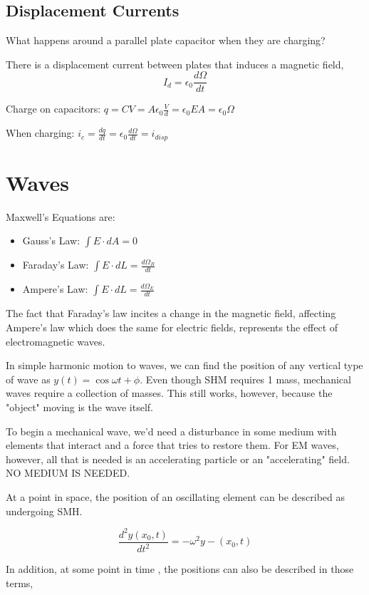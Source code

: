 \documentclass{article}
\begin{document}
\subsection{Displacement Currents}

What happens around a parallel plate capacitor when they are charging?

There is a displacement current between plates that induces a magnetic field, $$I_d=\epsilon_0\frac{d\Omega}{dt}$$

Charge on capacitors: $q=CV=A\epsilon_0 \frac{V}{d}=\epsilon_0 EA=\epsilon_0 \Omega$

When charging: $i_c=\frac{dq}{dt}=\epsilon_0\frac{d\Omega}{dt}=i_{disp}$

\section{Waves}

Maxwell's Equations are:
\begin{itemize}
	\item Gauss's Law: $\int{E\cdot dA}=0$
	\item Faraday's Law: $\int{E\cdot dL}=\frac{d\Omega_B}{dt}$
	\item Ampere's Law: $\int{E\cdot dL}=\frac{d\Omega_E}{dt}$

\end{itemize}

The fact that Faraday's law incites a change in the magnetic field, affecting Ampere's law which does the same for electric fields, 
represents the effect of electromagnetic waves.

In simple harmonic motion to waves, we can find the position of any vertical type of wave as 
$y(t)=\cos{\omega t + \phi}$. Even though SHM requires 1 mass, mechanical
waves require a collection of masses. This still works, however, because the "object" moving is the wave itself.

To begin a mechanical wave, we'd need a disturbance in some medium with elements that interact and a force that tries to restore them.
For EM waves, however, all that is needed is an accelerating particle or an "accelerating" field. NO MEDIUM IS NEEDED.

At a point in space, the position  of an oscillating element can be described as undergoing SMH.

$$\frac{d^2y(x_0,t)}{dt^2}=-\omega^2y-(x_0,t)$$

In addition, at some point in time , the positions can also be described in those terms, 
\end{document}
